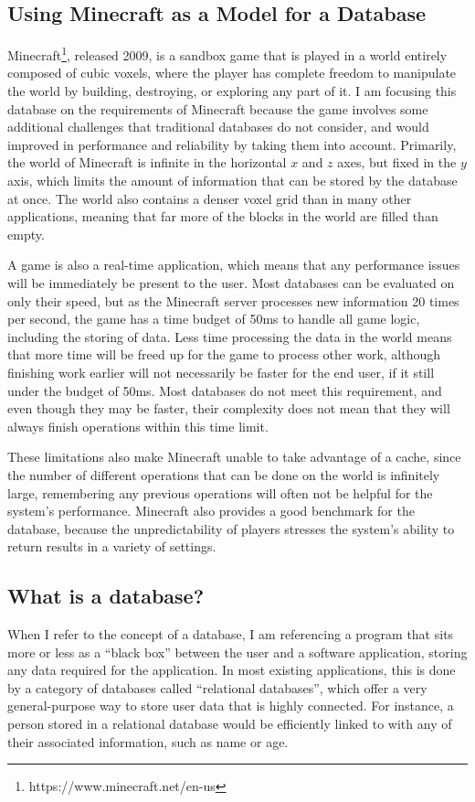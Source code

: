 \documentclass[10pt,twocolumn]{article}
\begin{document}
\subsection{Using Minecraft as a Model for a Database}

Minecraft\footnote{https://www.minecraft.net/en-us}, released 2009, is a sandbox
game that is played in a world entirely composed of cubic voxels, where the
player has complete freedom to manipulate the world by building, destroying, or
exploring any part of it. I am focusing this database on the requirements of
Minecraft because the game involves some additional challenges that traditional
databases do not consider, and would improved in performance and reliability by
taking them into account. Primarily, the world of Minecraft is infinite in the
horizontal $x$ and $z$ axes, but fixed in the $y$ axis, which limits the amount
of information that can be stored by the database at once. The world also
contains a denser voxel grid than in many other applications, meaning that far
more of the blocks in the world are filled than empty.

A game is also a real-time application, which means that any performance issues
will be immediately be present to the user. Most databases can be evaluated on
only their speed, but as the Minecraft server processes new information 20 times
per second, the game has a time budget of 50ms to handle all game logic,
including the storing of data. Less time processing the data in the world means
that more time will be freed up for the game to process other work, although
finishing work earlier will not necessarily be faster for the end user, if it
still under the budget of 50ms. Most databases do not meet this requirement, and
even though they may be faster, their complexity does not mean that they will
always finish operations within this time limit.

These limitations also make Minecraft unable to take advantage of a cache, since
the number of different operations that can be done on the world is infinitely
large, remembering any previous operations will often not be helpful for the
system's performance. Minecraft also provides a good benchmark for the database,
because the unpredictability of players stresses the system's ability to return
results in a variety of settings.

\subsection{What is a database?}
When I refer to the concept of a database, I am referencing a program that sits
more or less as a ``black box'' between the user and a software application,
storing any data required for the application. In most existing applications,
this is done by a category of databases called ``relational databases'', which
offer a very general-purpose way to store user data that is highly connected.
For instance, a person stored in a relational database would be efficiently
linked to with any of their associated information, such as name or age.
\end{document}
